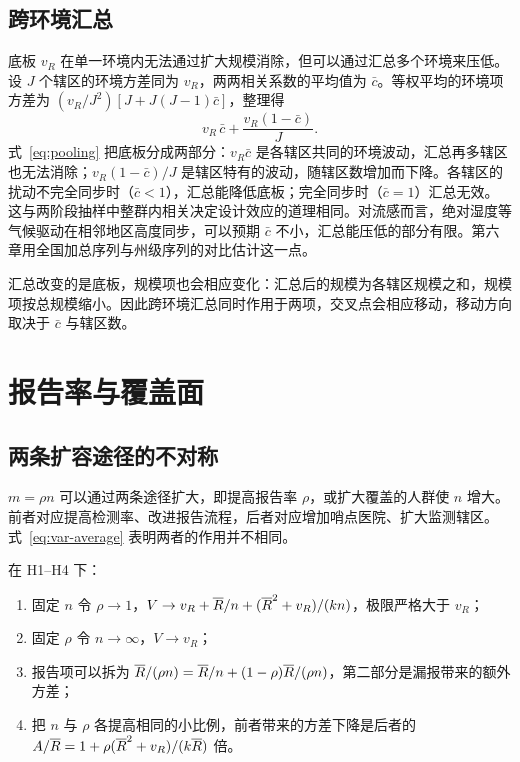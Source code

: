 \subsection{跨环境汇总}
\label{sec:model-pooling}

底板 $v_R$ 在单一环境内无法通过扩大规模消除，但可以通过汇总多个环境来压低。设 $J$ 个辖区的环境方差同为 $v_R$，两两相关系数的平均值为 $\bar c$。等权平均的环境项方差为 $(v_R/J^2)[J+J(J-1)\bar c]$，整理得
\begin{equation}
  v_R\,\bar c+\frac{v_R(1-\bar c)}{J}.
  \label{eq:pooling}
\end{equation}
式~\eqref{eq:pooling} 把底板分成两部分：$v_R\bar c$ 是各辖区共同的环境波动，汇总再多辖区也无法消除；$v_R(1-\bar c)/J$ 是辖区特有的波动，随辖区数增加而下降。各辖区的扰动不完全同步时（$\bar c<1$），汇总能降低底板；完全同步时（$\bar c=1$）汇总无效。这与两阶段抽样中整群内相关决定设计效应的道理相同\citep{kish1965survey}。对流感而言，绝对湿度等气候驱动在相邻地区高度同步\citep{shaman2010absolute}，可以预期 $\bar c$ 不小，汇总能压低的部分有限。第六章用全国加总序列与州级序列的对比估计这一点。

汇总改变的是底板，规模项也会相应变化：汇总后的规模为各辖区规模之和，规模项按总规模缩小。因此跨环境汇总同时作用于两项，交叉点会相应移动，移动方向取决于 $\bar c$ 与辖区数。

\section{报告率与覆盖面}
\label{sec:model-reporting}

\subsection{两条扩容途径的不对称}

$m=\rho n$ 可以通过两条途径扩大，即提高报告率 $\rho$，或扩大覆盖的人群使 $n$ 增大。前者对应提高检测率、改进报告流程，后者对应增加哨点医院、扩大监测辖区。式~\eqref{eq:var-average} 表明两者的作用并不相同。

\begin{proposition}[报告率与覆盖面的不对称]
\label{prop:reporting}
在 H1--H4 下：
\begin{enumerate}[label=(\roman*)]
  \item 固定 $n$ 令 $\rho\to1$，$V\to v_R+\overline{R}/n+(\overline{R}^2+v_R)/(kn)$，极限严格大于 $v_R$；
  \item 固定 $\rho$ 令 $n\to\infty$，$V\to v_R$；
  \item 报告项可以拆为 $\overline{R}/(\rho n)=\overline{R}/n+(1-\rho)\overline{R}/(\rho n)$，第二部分是漏报带来的额外方差；
  \item 把 $n$ 与 $\rho$ 各提高相同的小比例，前者带来的方差下降是后者的 $A/\overline{R}=1+\rho(\overline{R}^2+v_R)/(k\overline{R})$ 倍。
\end{enumerate}
\end{proposition}

